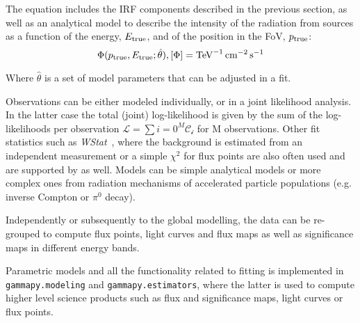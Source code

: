 \documentclass[longauth]{aa}
\newcommand{\code}[1]{\texttt{#1}}
\begin{document}
The equation includes the IRF components described in the previous section, as well as an analytical model to describe the
intensity of the radiation from \gammaray sources as a function of the energy, $E_{\rm true}$,
and of the position in the FoV, $p_{\rm true}$:
%
\begin{equation}
    \Phi(p_{\rm true}, E_{\rm true}; \hat{\theta}), [\Phi] = \si{TeV^{-1}.cm^{-2}.s^{-1}}
    \label{eq:general_source_model}
\end{equation}

Where $\hat{\theta}$ is a set of model parameters that can be adjusted in a fit.

Observations can be either modeled individually, or in a joint likelihood analysis.
In the latter case the total (joint) log-likelihood is given by the sum of the log-likelihoods
per observation $\mathcal{L} = \sum{i=0}^M \mathcal{C_i}$ for M observations. Other fit
statistics such as \emph{WStat}~\citep{WStat}, where the background is estimated from an independent
measurement or a simple $\chi^2$ for flux points are also often used
and are supported by \gammapy as well. Models can be simple analytical models or more complex
ones from radiation mechanisms of accelerated particle populations (e.g. inverse Compton or $\pi^{0}$ decay).

Independently or subsequently to the global modelling, the data can be re-grouped to compute
flux points, light curves and flux maps as well as significance maps in different energy bands.

Parametric models and all the functionality related to fitting is implemented in 
\code{gammapy.modeling} and \code{gammapy.estimators}, where the latter is used to
compute higher level science products such as flux and significance maps,
light curves or flux points. 



 
\end{document}
